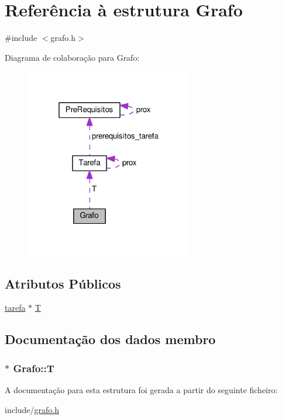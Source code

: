 \hypertarget{structGrafo}{\section{Referência à estrutura Grafo}
\label{structGrafo}
}


{\ttfamily \#include $<$grafo.\-h$>$}



Diagrama de colaboração para Grafo\-:
\nopagebreak
\begin{figure}[H]
\begin{center}
\leavevmode
\includegraphics[width=208pt]{structGrafo__coll__graph}
\end{center}
\end{figure}
\subsection*{Atributos Públicos}
\begin{DoxyCompactItemize}
\item 
\hyperlink{grafo_8h_ab156210f10bb550f6d61bea964f08c22}{tarefa} $\ast$ \hyperlink{structGrafo_aeb37989f62bb38c1b5ebce8bfa63ad32}{T}
\end{DoxyCompactItemize}


\subsection{Documentação dos dados membro}
\hypertarget{structGrafo_aeb37989f62bb38c1b5ebce8bfa63ad32}{
\subsubsection[{T}]{$\ast$ Grafo\-::\-T}}\label{structGrafo_aeb37989f62bb38c1b5ebce8bfa63ad32}


A documentação para esta estrutura foi gerada a partir do seguinte ficheiro\-:\begin{DoxyCompactItemize}
\item 
include/\hyperlink{grafo_8h}{grafo.\-h}\end{DoxyCompactItemize}

